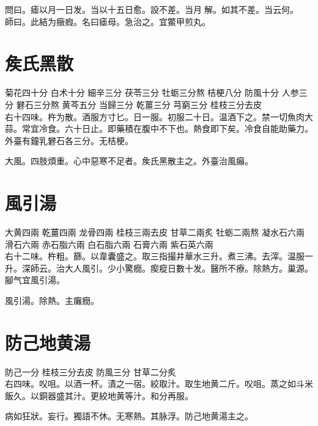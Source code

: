 問曰。瘧以月一日发。当以十五日愈。設不差。当月{\sungtpii 𥁞}解。如其不差。当云何。\\
師曰。此結为癥瘕。名曰瘧母。急治之。宜鱉甲煎丸。

\section{矦氏黑散}

菊花{\scriptsize 四十分} 白术{\scriptsize 十分} 細辛{\scriptsize 三分} 茯苓{\scriptsize 三分} 牡蛎{\scriptsize 三分熬} 桔梗{\scriptsize 八分} 防風{\scriptsize 十分} 人参{\scriptsize 三分} 礬石{\scriptsize 三分熬} 黄芩{\scriptsize 五分} 当歸{\scriptsize 三分} 乾薑{\scriptsize 三分} 芎窮{\scriptsize 三分} 桂枝{\scriptsize 三分去皮}\\
右十四味。杵为散。酒服方寸匕。日一服。初服二十日。温酒下之。禁一切魚肉大蒜。常宜冷食。六十日止。即藥積在腹中不下也。熱食即下矣。冷食自能助藥力。{\scriptsize 外臺有鐘乳礬石各三分。无桔梗。}

大風。四肢煩重。心中惡寒不足者。矦氏黑散主之。{\scriptsize 外臺治風癲。}

\section{風引湯}

大黄{\scriptsize 四兩} 乾薑{\scriptsize 四兩} 龙骨{\scriptsize 四兩} 桂枝{\scriptsize 三兩去皮} 甘草{二兩炙} 牡蛎{\scriptsize 二兩熬} 凝水石{\scriptsize 六兩} 滑石{\scriptsize 六兩} 赤石脂{\scriptsize 六兩} 白石脂{\scriptsize 六兩} 石膏{\scriptsize 六兩} 紫石英{\scriptsize 六兩}\\
右十二味。杵粗。篩。以韋囊盛之。取三指撮井華水三升。煮三沸。去滓。温服一升。{\scriptsize 深師云。治大人風引。少小驚癇。瘈瘲日數十发。醫所不療。除熱方。巢源。腳气宜風引湯。}

風引湯。除熱{\khaaitp 。主}癱癇。

\section{防己地黄湯}

防己{\scriptsize 一分} 桂枝{\scriptsize 三分去皮} 防風{\scriptsize 三分} 甘草{\scriptsize 二分炙}\\
右四味。㕮咀。以酒一杯。漬之一宿。絞取汁。取生地黄二斤。㕮咀。蒸之如斗米飯久。以銅器盛其汁。更絞地黄等汁。和分再服。

病如狂狀。妄行。獨語不休。无寒熱。其脉浮。防己地黄湯主之。


